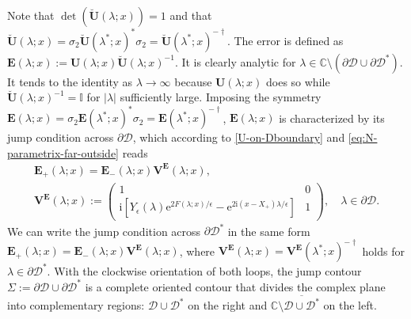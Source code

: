 \documentclass[12pt]{amsart}
\numberwithin{equation}{section}
\newcommand{\ee}{\mathrm{e}}
\newcommand{\ii}{\mathrm{i}}
\newcommand{\SP}{\lambda}
\begin{document}
Note that $\det(\breve{\mathbf{U}}(\SP;x))=1$ and that $\breve{\mathbf{U}}(\SP;x)=\sigma_2\breve{\mathbf{U}}(\SP^*;x)^*\sigma_2=\breve{\mathbf{U}}(\SP^*;x)^{-\dagger}$.  The error is defined as $\mathbf{E}(\SP;x):=\mathbf{U}(\SP;x)\breve{\mathbf{U}}(\SP;x)^{-1}$.  It is clearly analytic for $\SP\in\mathbb{C}\setminus (\partial \mathscr{D}\cup\partial \mathscr{D}^*)$.  It tends to the identity as $\SP\to\infty$ because $\mathbf{U}(\SP;x)$ does so while $\breve{\mathbf{U}}(\SP;x)^{-1}=\mathbb{I}$ for $|\SP|$ sufficiently large.   Imposing the symmetry $\mathbf{E}(\SP;x)=\sigma_2\mathbf{E}(\SP^*;x)^*\sigma_2=\mathbf{E}(\SP^*;x)^{-\dagger}$, $\mathbf{E}(\SP;x)$ is characterized by its jump condition across $\partial \mathscr{D}$, which according to \eqref{U-on-Dboundary} and \eqref{eq:N-parametrix-far-outside} reads
\begin{multline}
\mathbf{E}_+(\SP;x)=\mathbf{E}_-(\SP;x)\mathbf{V}^\mathbf{E}(\SP;x),\\
\mathbf{V}^\mathbf{E}(\SP;x):=\begin{pmatrix}1&0\\\ii [Y_\epsilon(\SP)\ee^{2F(\SP;x)/\epsilon}-\ee^{2\ii (x-X_+)\SP/\epsilon}] & 1\end{pmatrix},\quad\SP\in\partial \mathscr{D}.
\label{eq:E-jump-partial-D}
\end{multline}
We can write the jump condition across $\partial\mathscr{D}^*$ in the same form $\mathbf{E}_+(\lambda;x)=\mathbf{E}_-(\lambda;x)\mathbf{V}^\mathbf{E}(\lambda;x)$, where $\mathbf{V}^\mathbf{E}(\lambda;x)=\mathbf{V}^\mathbf{E}(\lambda^*;x)^{-\dagger}$ holds for $\lambda\in\partial\mathscr{D}^*$.
With the clockwise orientation of both loops, the jump contour  $\Sigma:=\partial \mathscr{D}\cup\partial \mathscr{D}^*$ is a complete oriented contour that divides the complex plane into complementary regions:  $\mathscr{D}\cup \mathscr{D}^*$ on the right and $\mathbb{C}\setminus\overline{\mathscr{D}\cup \mathscr{D}^*}$ on the left.  
\end{document}
